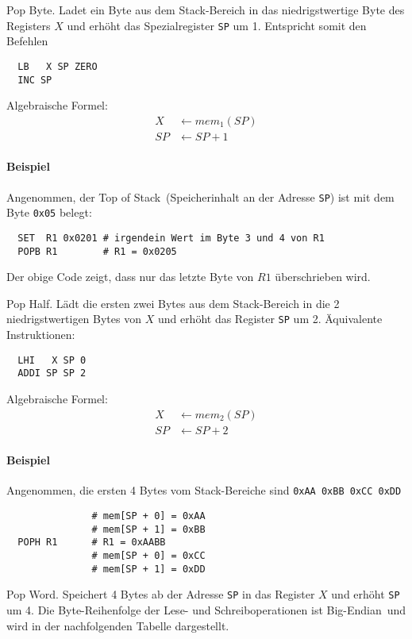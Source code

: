\glqq Pop Byte\grqq.
Ladet ein Byte aus dem Stack-Bereich in das niedrigstwertige Byte des Registers
$X$ und erhöht das Spezialregister \texttt{SP} um 1.
Entspricht somit den Befehlen 
\begin{lstlisting}
  LB   X SP ZERO
  INC SP
\end{lstlisting}
Algebraische Formel:
\begin{align*}
  X  & \gets mem_{1}(SP) \\
  SP & \gets SP + 1
\end{align*}

\paragraph{Beispiel}
Angenommen, der \glqq Top of Stack\grqq\ (Speicherinhalt an der Adresse
\texttt{SP}) ist mit dem Byte \texttt{0x05} belegt:
\begin{lstlisting}
  SET  R1 0x0201 # irgendein Wert im Byte 3 und 4 von R1
  POPB R1        # R1 = 0x0205
\end{lstlisting}
Der obige Code zeigt, dass nur das letzte Byte von $R1$ überschrieben wird.


\glqq Pop Half\grqq.
Lädt die ersten zwei Bytes aus dem Stack-Bereich in die 2 niedrigstwertigen
Bytes von $X$ und erhöht das Register \texttt{SP} um 2.
Äquivalente Instruktionen:
\begin{lstlisting}
  LHI   X SP 0
  ADDI SP SP 2
\end{lstlisting}

Algebraische Formel:
\begin{align*}
  X  & \gets mem_{2}(SP) \\
  SP & \gets SP + 2
\end{align*}

\paragraph{Beispiel}
Angenommen, die ersten 4 Bytes vom Stack-Bereiche sind \texttt{0xAA 0xBB 0xCC 0xDD}
\begin{lstlisting}
               # mem[SP + 0] = 0xAA
               # mem[SP + 1] = 0xBB
  POPH R1      # R1 = 0xAABB
               # mem[SP + 0] = 0xCC
               # mem[SP + 1] = 0xDD
\end{lstlisting}




\glqq Pop Word\grqq.
Speichert 4 Bytes ab der Adresse \texttt{SP} in das Register $X$ und erhöht
\texttt{SP} um 4.
Die Byte-Reihenfolge der Lese- und Schreiboperationen ist \glqq Big-Endian\grqq\
und wird in der nachfolgenden Tabelle dargestellt.

